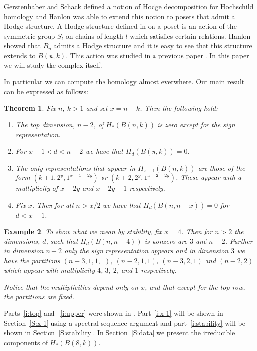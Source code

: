 \documentclass{elsart}
\newtheorem{theorem}{Theorem}[section]
\newtheorem{example}[theorem]{Example}
\begin{document}
Gerstenhaber and Schack \cite{GS} defined a notion of Hodge decomposition for Hochschild homology and Hanlon \cite{Hanlon}
was able to extend this notion to posets that admit a Hodge structure. A Hodge structure defined in \cite{Hanlon} on a 
poset is an action of the symmetric group
$S_l$ on chains of length $l$ which satisfies certain 
relations. Hanlon showed that $B_n$ admits a Hodge structure and it is easy to see that this structure extends to $B(n, k)$.
This action was studied in a previous paper \cite{S1}. 
In this paper we will study the complex itself.

In particular we can compute the homology almost everwhere. Our main result can be expressed as follows:
\begin{theorem} \label{T:main} Fix $n$, $k>1$ and set $x=n-k$. Then the following hold:
  \begin{enumerate}
    \item \label{i:top} The top dimension, $n-2$, of $H_*(B(n, k))$ is zero except for the sign representation.
    \item \label{i:upper} For $x-1 < d < n-2$ we have that $H_d(B(n, k))=0$.
    \item \label{i:x-1} The only representations that appear in $H_{x-1}(B(n, k))$ are those of the form 
          $(k+1, 2^y, 1^{x-1-2y})$ or
          $(k+2, 2^y, 1^{x-2-2y})$. These appear with a multiplicity of $x-2y$ and $x-2y-1$ respectively.
    \item \label{i:stability} Fix $x$. Then for all $n > x/2$ we have that $H_d(B(n, n-x)) = 0$ for $d < x - 1$.
  \end{enumerate}
\end{theorem}

\begin{example}
  To show what we mean by stability, fix $x=4$. Then for $n> 2$ the dimensions, $d$,  such that $H_d(B(n, n-4))$ is nonzero 
  are $3$ and $n-2$. Further
  in dimension $n-2$ only the sign representation appears and in dimension $3$ we have the partitions
  $(n-3, 1, 1, 1)$, $(n-2, 1, 1)$, $(n-3, 2, 1)$ and $(n-2, 2)$ which appear with multiplicity $4$, $3$, $2$, and $1$
  respectively.
  
  Notice that the multiplicities depend only on $x$, and that except for the top row, the partitions are fixed.
\end{example}

Parts~\ref{i:top} and ~\ref{i:upper} were shown in \cite{S1}. Part~\ref{i:x-1} will be shown in Section~\ref{S:x-1} using 
a spectral sequence argument and part~\ref{i:stability} will be shown in Section~\ref{S:stability}. In Section~\ref{S:data}
we present the irreducible components of $H_*(B(8, k))$. 
\end{document}
